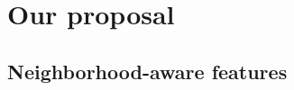 

\section{Our proposal}\label{sec:cafe-proposal}


\subsection{Neighborhood-aware features}\label{sec:cafe-features}


